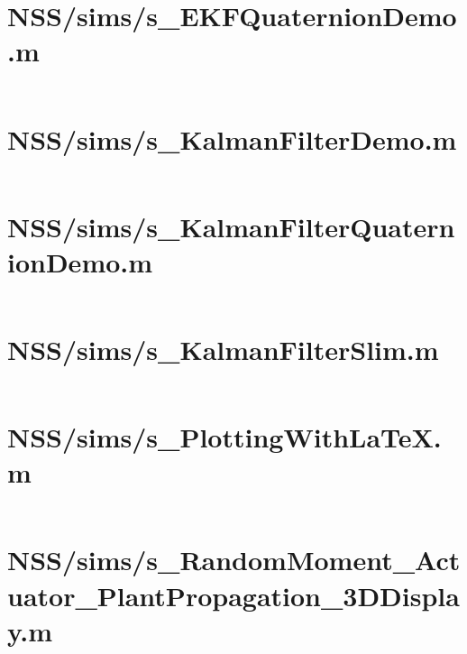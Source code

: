 \pagebreak
\section*{NSS/sims/s\_EKFQuaternionDemo.m}\label{code:NSS/sims/s_EKFQuaternionDemo.m}
\inputminted[linenos,fontsize=\scriptsize]{matlab}{/home/dcouture/git/mathyourlife/TSatPy/beta_versions/matlab_object_oriented/sims/s_EKFQuaternionDemo.m}

\pagebreak
\section*{NSS/sims/s\_KalmanFilterDemo.m}\label{code:NSS/sims/s_KalmanFilterDemo.m}
\inputminted[linenos,fontsize=\scriptsize]{matlab}{/home/dcouture/git/mathyourlife/TSatPy/beta_versions/matlab_object_oriented/sims/s_KalmanFilterDemo.m}

\pagebreak
\section*{NSS/sims/s\_KalmanFilterQuaternionDemo.m}\label{code:NSS/sims/s_KalmanFilterQuaternionDemo.m}
\inputminted[linenos,fontsize=\scriptsize]{matlab}{/home/dcouture/git/mathyourlife/TSatPy/beta_versions/matlab_object_oriented/sims/s_KalmanFilterQuaternionDemo.m}

\pagebreak
\section*{NSS/sims/s\_KalmanFilterSlim.m}\label{code:NSS/sims/s_KalmanFilterSlim.m}
\inputminted[linenos,fontsize=\scriptsize]{matlab}{/home/dcouture/git/mathyourlife/TSatPy/beta_versions/matlab_object_oriented/sims/s_KalmanFilterSlim.m}

\pagebreak
\section*{NSS/sims/s\_PlottingWithLaTeX.m}\label{code:NSS/sims/s_PlottingWithLaTeX.m}
\inputminted[linenos,fontsize=\scriptsize]{matlab}{/home/dcouture/git/mathyourlife/TSatPy/beta_versions/matlab_object_oriented/sims/s_PlottingWithLaTeX.m}

\pagebreak
\section*{NSS/sims/s\_RandomMoment\_Actuator\_PlantPropagation\_3DDisplay.m}\label{code:NSS/sims/s_RandomMoment_Actuator_PlantPropagation_3DDisplay.m}
\inputminted[linenos,fontsize=\scriptsize]{matlab}{/home/dcouture/git/mathyourlife/TSatPy/beta_versions/matlab_object_oriented/sims/s_RandomMoment_Actuator_PlantPropagation_3DDisplay.m}

